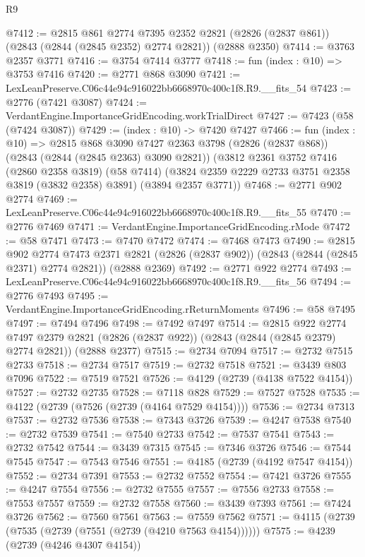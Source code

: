 \begin{lexlean}{R9}
\begin{coremodule}
@7412 := @2815
    @861
    @2774
    @7395
    @2352
    @2821
    (@2826 (@2837 @861))
    (@2843 (@2844 (@2845 @2352) @2774 @2821))
    (@2888 @2350)
@7414 := @3763 @2357 @3771
@7416 := @3754 @7414 @3777
@7418 := fun (index : @10) => @3753 @7416
@7420 := @2771 @868 @3090
@7421 := LexLeanPreserve.C06c44e94c916022bb6668970c400c1f8.R9.__fits_54
@7423 := @2776 (@7421 @3087)
@7424 := VerdantEngine.ImportanceGridEncoding.workTrialDirect
@7427 := @7423 (@58 (@7424 @3087))
@7429 := (index : @10) -> @7420 @7427
@7466 := fun (index : @10) =>
  @2815
    @868
    @3090
    @7427
    @2363
    @3798
    (@2826 (@2837 @868))
    (@2843 (@2844 (@2845 @2363) @3090 @2821))
    (@3812
      @2361
      @3752
      @7416
      (@2860 @2358 @3819)
      (@58 @7414)
      (@3824 @2359 @2229 @2733 @3751 @2358 @3819 (@3832 @2358) @3891)
      (@3894 @2357 @3771))
@7468 := @2771 @902 @2774
@7469 := LexLeanPreserve.C06c44e94c916022bb6668970c400c1f8.R9.__fits_55
@7470 := @2776 @7469
@7471 := VerdantEngine.ImportanceGridEncoding.rMode
@7472 := @58 @7471
@7473 := @7470 @7472
@7474 := @7468 @7473
@7490 := @2815
    @902
    @2774
    @7473
    @2371
    @2821
    (@2826 (@2837 @902))
    (@2843 (@2844 (@2845 @2371) @2774 @2821))
    (@2888 @2369)
@7492 := @2771 @922 @2774
@7493 := LexLeanPreserve.C06c44e94c916022bb6668970c400c1f8.R9.__fits_56
@7494 := @2776 @7493
@7495 := VerdantEngine.ImportanceGridEncoding.rReturnMoments
@7496 := @58 @7495
@7497 := @7494 @7496
@7498 := @7492 @7497
@7514 := @2815
    @922
    @2774
    @7497
    @2379
    @2821
    (@2826 (@2837 @922))
    (@2843 (@2844 (@2845 @2379) @2774 @2821))
    (@2888 @2377)
@7515 := @2734 @7094
@7517 := @2732 @7515 @2733
@7518 := @2734 @7517
@7519 := @2732 @7518
@7521 := @3439 @803 @7096
@7522 := @7519 @7521
@7526 := @4129 (@2739 (@4138 @7522 @4154))
@7527 := @2732 @2735
@7528 := @7118 @828
@7529 := @7527 @7528
@7535 := @4122 (@2739 (@7526 (@2739 (@4164 @7529 @4154))))
@7536 := @2734 @7313
@7537 := @2732 @7536
@7538 := @7343 @3726
@7539 := @4247 @7538
@7540 := @2732 @7539
@7541 := @7540 @2733
@7542 := @7537 @7541
@7543 := @2732 @7542
@7544 := @3439 @7315
@7545 := @7346 @3726
@7546 := @7544 @7545
@7547 := @7543 @7546
@7551 := @4185 (@2739 (@4192 @7547 @4154))
@7552 := @2734 @7391
@7553 := @2732 @7552
@7554 := @7421 @3726
@7555 := @4247 @7554
@7556 := @2732 @7555
@7557 := @7556 @2733
@7558 := @7553 @7557
@7559 := @2732 @7558
@7560 := @3439 @7393
@7561 := @7424 @3726
@7562 := @7560 @7561
@7563 := @7559 @7562
@7571 := @4115 (@2739 (@7535 (@2739 (@7551 (@2739 (@4210 @7563 @4154))))))
@7575 := @4239 (@2739 (@4246 @4307 @4154))

\end{coremodule}
\end{lexlean}
